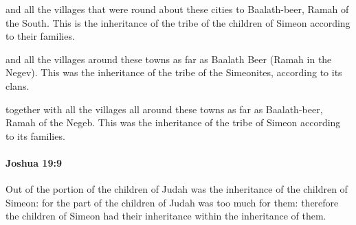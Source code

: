 			\begin{versebox}
					\item[BHS] 
					\item[ASV] and all the villages that were round about these cities to Baalath-beer, Ramah of the South. This is the inheritance of the tribe of the children of Simeon according to their families.
					\item[NIV] and all the villages around these towns as far as Baalath Beer (Ramah in the Negev). This was the inheritance of the tribe of the Simeonites, according to its clans.
					\item[NRSV] together with all the villages all around these towns as far as Baalath-beer, Ramah of the Negeb. This was the inheritance of the tribe of Simeon according to its families.
			\end{versebox}

		\paragraph{Joshua 19:9} %
			\label{JOSHUA-19-9}

			Out of the portion of the children of Judah was the inheritance of the children of Simeon: for the part of the children of Judah was too much for them: therefore the children of Simeon had their inheritance within the inheritance of them.

